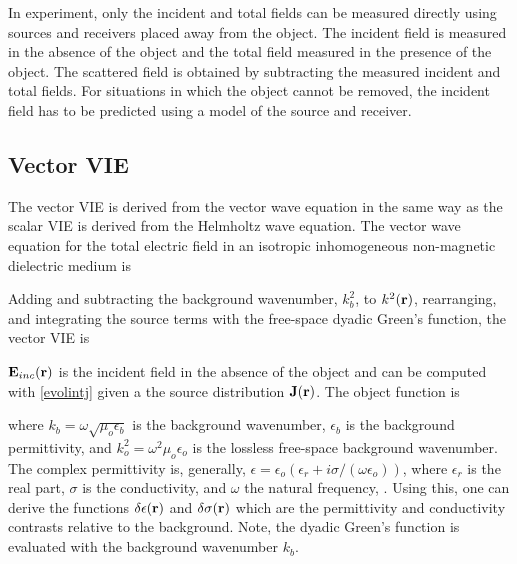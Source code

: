 In experiment, only the incident and total fields can be measured directly using sources and receivers placed away from the object. The incident field is measured in the absence of the object and the total field measured in the presence of the object. The scattered field is obtained by subtracting the measured incident and total fields. For situations in which the object cannot be removed, the incident field has to be predicted using a model of the source and receiver. %

\subsection{Vector VIE}

The vector VIE is derived from the vector wave equation in the same way as the scalar VIE is derived from the Helmholtz wave equation. The vector wave equation for the total electric field in an isotropic inhomogeneous non-magnetic dielectric medium is \cite{chew1995waves}

Adding and subtracting the background wavenumber, $k_b^2$, to $k^2(\mathbf{r})$, rearranging, and integrating the source terms with the free-space dyadic Green's function, the vector VIE is 

$\mathbf{E}_{inc}(\mathbf{r})$ is the incident field in the absence of the object and can be computed with \eqref{evolintj} given a the source distribution $\mathbf{J}(\mathbf{r})$. The object function is 

\noindent where $k_b = \omega\sqrt{\mu_o\epsilon_b}$ is the background wavenumber, $\epsilon_b$ is the background permittivity, and $k_o^2 = \omega^2\mu_o\epsilon_o$ is the lossless free-space background wavenumber. The complex permittivity is, generally, $\epsilon = \epsilon_o(\epsilon_r + i\sigma/(\omega\epsilon_o))$, where $\epsilon_r$ is the real part, $\sigma$ is the conductivity, and $\omega$ the natural frequency, \cite{chew1995waves}. Using this, one can derive the functions $\delta\epsilon(\mathbf{r})$ and $\delta \sigma(\mathbf{r})$ which are the permittivity and conductivity contrasts relative to the background. Note, the dyadic Green's function is evaluated with the background wavenumber $k_b$. 

